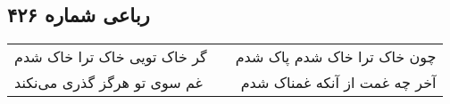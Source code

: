 \begin{center}
\section*{رباعی شماره ۴۲۶}
\label{sec:sh426}
\begin{longtable}{l p{0.5cm} r}
گر خاک تویی خاک ترا خاک شدم
&&
چون خاک ترا خاک شدم پاک شدم
\\
غم سوی تو هرگز گذری می‌نکند
&&
آخر چه غمت از آنکه غمناک شدم
\\
\end{longtable}
\end{center}
